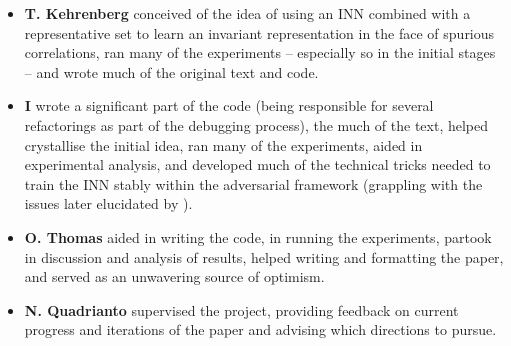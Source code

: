%
{\renewcommand\labelitemi{}
%
\begin{itemize}
    \item 
        \textbf{T. Kehrenberg} conceived of the idea of using an INN combined with a
        representative set to learn an invariant representation in the face of spurious
        correlations, ran many of the experiments -- especially so in the initial stages -- and
        wrote much of the original text and code.
    \item 
        \textbf{I} wrote a significant part of the code (being responsible for several refactorings
        as part of the debugging process), the much of the text, helped crystallise the initial
        idea, ran many of the experiments, aided in experimental analysis, and developed much of
        the technical tricks needed to train the INN stably within the adversarial framework
        (grappling with the issues later elucidated by \citet{behrmann2021understanding}).
    \item 
        \textbf{O. Thomas} aided in writing the code, in running the experiments, partook in
        discussion and analysis of results, helped writing and formatting the paper, and served as
        an unwavering source of optimism.
    \item
        \textbf{N. Quadrianto} supervised the project, providing feedback on current progress and
        iterations of the paper and advising which directions to pursue.
\end{itemize}
%
}
